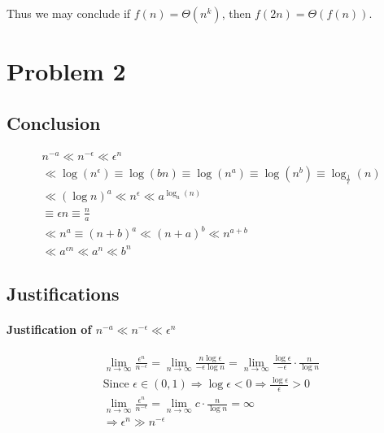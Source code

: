 \documentclass[12pt]{article}
\begin{document}
Thus we may conclude if $f(n) = \Theta(n^k)$, then $f(2n) = \Theta(f(n))$.

\section{Problem 2}

\subsection{Conclusion}

\begin{gather}
     n^{-a} \ll n^{-\epsilon} \ll \epsilon^n  \\
    \ll \log(n^\epsilon) \equiv \log(bn) \equiv \log(n^a) \equiv \log(n^b) \equiv \log_{\frac{1}{\epsilon}}(n)\\
    \ll  (\log n)^a \ll n^{\epsilon} \ll a^{\log_a(n)} \\
    \equiv \epsilon n \equiv \frac{n}{a} \\
    \ll n^a \equiv (n+b)^a \ll (n+a)^b \ll n^{a+b} \\
    \ll a^{\epsilon n} \ll a^n \ll b^n
\end{gather}


\subsection{Justifications}


\paragraph{Justification of $n^{-a} \ll n^{-\epsilon} \ll \epsilon^n$\newline}

\begin{gather}
    \lim\limits_{n \to \infty} \frac{\epsilon^n}{n^{-\epsilon}} = \lim\limits_{n \to \infty} \frac{n\log \epsilon}{-\epsilon \log n} = \lim\limits_{n \to \infty} \frac{\log \epsilon}{-\epsilon} \cdot \frac{n}{\log n} \\
    \text{Since } \epsilon \in (0, 1) \Rightarrow \log \epsilon < 0 \Rightarrow \frac{\log \epsilon}{\epsilon} > 0 \nonumber\\
    \lim\limits_{n \to \infty} \frac{\epsilon^n}{n^{-\epsilon}} = \lim\limits_{n \to \infty} c \cdot \frac{n}{\log n} = \infty \\
    \Rightarrow \epsilon^n \gg n^{-\epsilon}
\end{gather}
\end{document}

